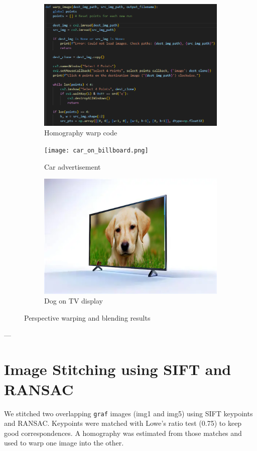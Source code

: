 \documentclass[11pt,a4paper]{article}
\begin{document}
\begin{figure}[H]\centering
\begin{subfigure}{0.31\textwidth}
\includegraphics[width=\linewidth]{images/q3_code.png}
\caption{Homography warp code}
\end{subfigure}
\begin{subfigure}{0.31\textwidth}
\texttt{[image: car\_on\_billboard.png]}
\caption{Car advertisement}
\end{subfigure}
\begin{subfigure}{0.31\textwidth}
\includegraphics[width=\linewidth]{dog_on_tv.png}
\caption{Dog on TV display}
\end{subfigure}
\caption{Perspective warping and blending results}
\end{figure}

---

\section{Image Stitching using SIFT and RANSAC}
We stitched two overlapping \texttt{graf} images (img1 and img5) using SIFT keypoints and RANSAC. Keypoints were matched with Lowe's ratio test (0.75) to keep good correspondences. A homography was estimated from those matches and used to warp one image into the other.
\end{document}
